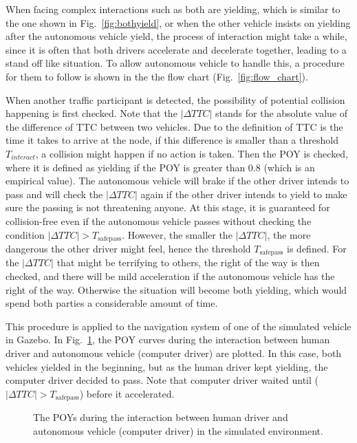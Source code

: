 When facing complex interactions such as both are yielding, which is similar to the one shown in Fig.~\ref{fig:bothyield}, or when the other vehicle insists on yielding after the autonomous vehicle yield, the process of interaction might take a while, since it is often that both drivers accelerate and decelerate together, leading to a stand off like situation. To allow autonomous vehicle to handle this, a procedure for them to follow is shown in the the flow chart (Fig.~\ref{fig:flow_chart}).

When another traffic participant is detected, the possibility of potential collision happening is first checked. Note that the $\lvert \Delta TTC \rvert$ stands for the absolute value of the difference of TTC between two vehicles. Due to the definition of TTC is the time it takes to arrive at the node, if this difference is smaller than a threshold $T_{interact}$, a collision might happen if no action is taken. Then the POY is checked, where it is defined as yielding if the POY is greater than 0.8 (which is an empirical value). The autonomous vehicle will brake if the other driver intends to pass and will check the $\lvert \Delta TTC \rvert$ again if the other driver intends to yield to make sure the passing is not threatening anyone. At this stage, it is guaranteed for collision-free even if the autonomous vehicle passes without checking the condition $\lvert \Delta TTC \rvert > T_{\text{safepass}}$. However, the smaller the $\lvert \Delta TTC \rvert$, the more dangerous the other driver might feel, hence the threshold $T_{\text{safepass}}$ is defined. For the $\lvert \Delta TTC \rvert$ that might be terrifying to others, the right of the way is then checked, and there will be mild acceleration if the autonomous vehicle has the right of the way. Otherwise the situation will become both yielding, which would spend both parties a considerable amount of time. 

This procedure is applied to the navigation system of one of the simulated vehicle in Gazebo. In Fig.~\ref{fig:POY_HC}, the POY curves during the interaction between human driver and autonomous vehicle (computer driver) are plotted. In this case, both vehicles yielded in the beginning, but as the human driver kept yielding, the computer driver decided to pass. Note that computer driver waited until ($\lvert \Delta TTC \rvert > T_{\text{safepass}}$) before it accelerated.

\begin{figure}[htbp!]
\begin{center}
\end{center}
\caption{The POYs during the interaction between human driver and autonomous vehicle (computer driver) in the simulated environment.}
\label{fig:POY_HC} 
\end{figure}

